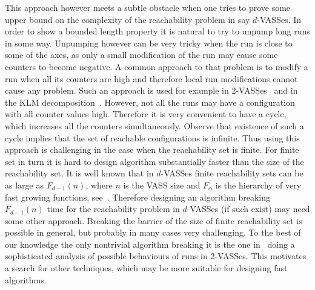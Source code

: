 This approach however meets a subtle obstacle when one tries to prove some upper bound on the complexity
of the reachability problem in say $d$-VASSes.
In order to show a bounded length property it is natural to try to unpump long runs in some way. Unpumping however
can be very tricky when the run is close to some of the axes, as only a small modification of the run may cause some counters to
become negative. A common approach to that problem is to modify a run when all its counters are high and therefore local run
modifications cannot cause any problem. Such an approach is used for example in 2-VASSes~\cite{DBLP:conf/lics/BlondinFGHM15}
and in the KLM decomposition~\cite{DBLP:conf/stoc/Kosaraju82, DBLP:journals/tcs/Lambert92, DBLP:conf/stoc/Mayr81}.
However, not all the runs may have a configuration with all counter values high. Therefore it is very convenient to have
a cycle, which increases all the counters simultaneously. Observe that existence of such a cycle implies that
the set of reachable configurations is infinite. Thus using this approach is challenging in the case when the reachability set is finite.
For finite set in turn it is hard to design algorithm substantially faster than the size of the reachability set.
It is well known that in $d$-VASSes finite reachability sets can be as large as $F_{d-1}(n)$, where
$n$ is the VASS size and $F_\alpha$ is the hierarchy of very fast growing functions, see~\cite{DBLP:journals/toct/Schmitz16}.
Therefore designing an algorithm breaking $F_{d-1}(n)$ time for the reachability problem in $d$-VASSes
(if such exist) may need some other approach. Breaking the barrier of the size of finite reachability set is possible in general,
but probably in many cases very challenging. To the best of our knowledge the only nontrivial algorithm breaking it 
is the one in~\cite{DBLP:conf/lics/EnglertLT16} doing a sophisticated analysis of possible behaviours of runs in 2-VASSes.
This motivates a search for other techniques, which may be more suitable for designing fast algorithms.

